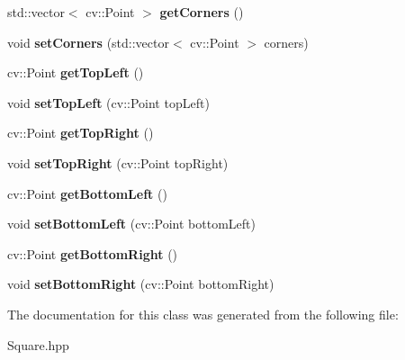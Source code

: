 \begin{DoxyCompactItemize}
\item 
\mbox{\label{class_square_a53b1e1223e97676db711dd75f2daa508}} 
std\+::vector$<$ cv\+::\+Point $>$ {\bfseries get\+Corners} ()
\item 
\mbox{\label{class_square_a84c4995b49318b5191a4fe3739e4f081}} 
void {\bfseries set\+Corners} (std\+::vector$<$ cv\+::\+Point $>$ corners)
\item 
\mbox{\label{class_square_a42b9d166cf37272874e4935e9178b4fe}} 
cv\+::\+Point {\bfseries get\+Top\+Left} ()
\item 
\mbox{\label{class_square_acb761285e20face2022455dcbec94da1}} 
void {\bfseries set\+Top\+Left} (cv\+::\+Point top\+Left)
\item 
\mbox{\label{class_square_a7bbb8c4184f70ea57f3cb1a7e5574fc2}} 
cv\+::\+Point {\bfseries get\+Top\+Right} ()
\item 
\mbox{\label{class_square_aa98e6a5531a41610da56a1289973619f}} 
void {\bfseries set\+Top\+Right} (cv\+::\+Point top\+Right)
\item 
\mbox{\label{class_square_aafe4233643d20d20be71e01c1ebee1f1}} 
cv\+::\+Point {\bfseries get\+Bottom\+Left} ()
\item 
\mbox{\label{class_square_a9ce15c8f5c3972aa82b0abb2d3a02e9c}} 
void {\bfseries set\+Bottom\+Left} (cv\+::\+Point bottom\+Left)
\item 
\mbox{\label{class_square_ac3c23f97b3ae3e5b4a185165d5a13ac2}} 
cv\+::\+Point {\bfseries get\+Bottom\+Right} ()
\item 
\mbox{\label{class_square_a709d566fdf9327d41db0a4a08b105737}} 
void {\bfseries set\+Bottom\+Right} (cv\+::\+Point bottom\+Right)
\end{DoxyCompactItemize}


The documentation for this class was generated from the following file\+:\begin{DoxyCompactItemize}
\item 
Square.\+hpp\end{DoxyCompactItemize}

